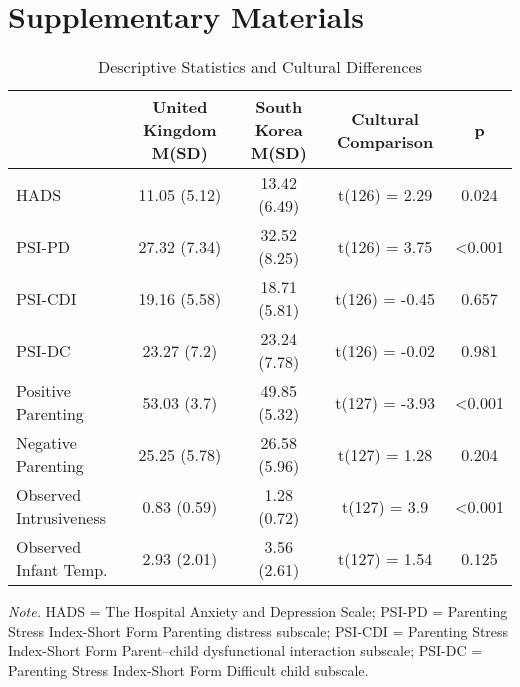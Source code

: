 \documentclass[
]{article}
\begin{document}
\newpage

\hypertarget{supplementary-materials}{%
\section*{Supplementary Materials}\label{supplementary-materials}}

\begin{table}[H]

\caption{\label{tab:table1}Descriptive Statistics and Cultural Differences}
\centering
\fontsize{8}{10}\selectfont
\begin{tabular}[t]{lcccc}
\toprule
\textbf{ } & \textbf{United Kingdom M(SD)} & \textbf{South Korea M(SD)} & \textbf{Cultural Comparison} & \textbf{p}\\
\midrule
HADS & 11.05 (5.12) & 13.42 (6.49) & t(126) = 2.29 & 0.024\\
PSI-PD & 27.32 (7.34) & 32.52 (8.25) & t(126) = 3.75 & <0.001\\
PSI-CDI & 19.16 (5.58) & 18.71 (5.81) & t(126) = -0.45 & 0.657\\
PSI-DC & 23.27 (7.2) & 23.24 (7.78) & t(126) = -0.02 & 0.981\\
Positive Parenting & 53.03 (3.7) & 49.85 (5.32) & t(127) = -3.93 & <0.001\\
\addlinespace
Negative Parenting & 25.25 (5.78) & 26.58 (5.96) & t(127) = 1.28 & 0.204\\
Observed Intrusiveness & 0.83 (0.59) & 1.28 (0.72) & t(127) = 3.9 & <0.001\\
Observed Infant Temp. & 2.93 (2.01) & 3.56 (2.61) & t(127) = 1.54 & 0.125\\
\bottomrule
\end{tabular}
\end{table}

\emph{Note.} HADS = The Hospital Anxiety and Depression Scale; PSI-PD = Parenting Stress Index-Short Form Parenting distress subscale; PSI-CDI = Parenting Stress Index-Short Form Parent--child dysfunctional interaction subscale; PSI-DC = Parenting Stress Index-Short Form Difficult child subscale.

\newpage
\end{document}
